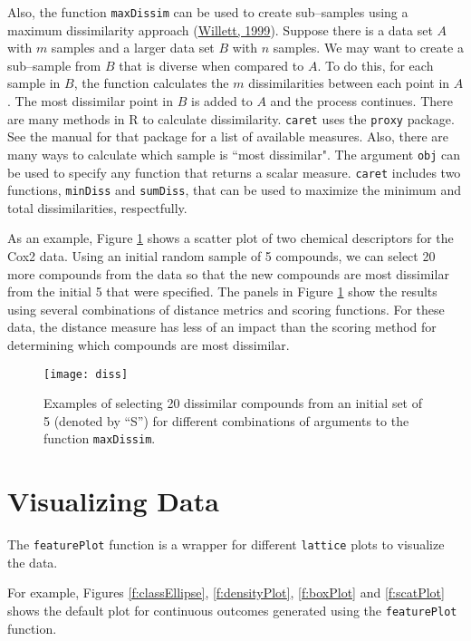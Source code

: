 \documentclass[12pt]{article}
\begin{document}
Also, the function \texttt{maxDissim} can be used to create sub--samples using a maximum dissimilarity approach (\href{http://www.liebertonline.com/doi/abs/10.1089/106652799318382}{Willett, 1999}). Suppose there is a data set $A$ with $m$ samples and a larger data set $B$ with $n$ samples. We may want to create a sub--sample from $B$ that is diverse when compared to $A$. To do this, for each sample in $B$, the function calculates the $m$ dissimilarities between each point in $A$. The most dissimilar point in $B$ is added to $A$ and the process continues. There are many methods in R to calculate dissimilarity. \texttt{caret} uses the \texttt{proxy} package. See the manual for that package for a list of available measures. Also, there are many ways to calculate which sample is ``most dissimilar". The argument \texttt{obj} can be used to specify any function that returns a scalar measure. \texttt{caret} includes two functions, \texttt{minDiss} and \texttt{sumDiss}, that can be used to maximize the minimum and total dissimilarities, respectfully.

As an example, Figure \ref{f:diss} shows a scatter plot of two chemical descriptors for the Cox2 data. Using an initial random sample of 5 compounds, we can select 20 more compounds from the data so that the new compounds are most dissimilar from the initial 5 that were specified. The panels in Figure \ref{f:diss} show the results using several combinations of distance metrics and scoring functions. For these data, the distance measure has less of an impact than the scoring method for determining which compounds are most dissimilar.


\begin{figure}[p]
   \begin{center}	
      \texttt{[image: diss]}
      \caption{Examples of selecting 20 dissimilar compounds from an initial set of 5 (denoted by ``S'') for different combinations of arguments to the function \texttt{maxDissim}.}
      \label{f:diss}         
   \end{center}
\end{figure}  

\section{Visualizing Data}

The \texttt{featurePlot} function is a wrapper for different \texttt{lattice} plots to visualize the data.

For example, Figures \ref{f:classEllipse}, \ref{f:densityPlot}, \ref{f:boxPlot} and \ref{f:scatPlot} shows the default plot for continuous outcomes generated using the \texttt{featurePlot} function. 
\end{document}
